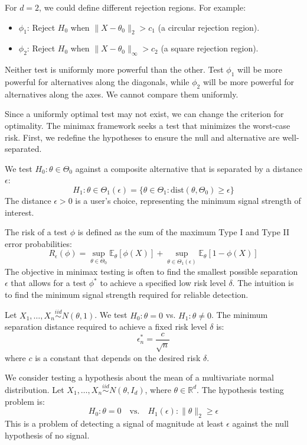 For $d=2$, we could define different rejection regions. For example:
\begin{itemize}
    \item $\phi_1$: Reject $H_0$ when $\|X - \theta_0\|_2 > c_1$ (a circular rejection region).
    \item $\phi_2$: Reject $H_0$ when $\|X - \theta_0\|_{\infty} > c_2$ (a square rejection region).
\end{itemize}
Neither test is uniformly more powerful than the other. Test $\phi_1$ will be more powerful for alternatives along the diagonals, while $\phi_2$ will be more powerful for alternatives along the axes. We cannot compare them uniformly.


Since a uniformly optimal test may not exist, we can change the criterion for optimality. The minimax framework seeks a test that minimizes the worst-case risk. First, we redefine the hypotheses to ensure the null and alternative are well-separated.

\begin{de}
We test $H_0: \theta \in \Theta_0$ against a composite alternative that is separated by a distance $\epsilon$:
$$
H_1: \theta \in \Theta_1(\epsilon) = \{ \theta \in \Theta_1 : \text{dist}(\theta, \Theta_0) \ge \epsilon \}
$$
The distance $\epsilon > 0$ is a user's choice, representing the minimum signal strength of interest.
\end{de}

The risk of a test $\phi$ is defined as the sum of the maximum Type I and Type II error probabilities:
$$
R_{\epsilon}(\phi) = \sup_{\theta \in \Theta_0} \mathbb{E}_{\theta}[\phi(X)] + \sup_{\theta \in \Theta_1(\epsilon)} \mathbb{E}_{\theta}[1-\phi(X)]
$$
The objective in minimax testing is often to find the smallest possible separation $\epsilon$ that allows for a test $\phi^*$ to achieve a specified low risk level $\delta$. The intuition is to find the minimum signal strength required for reliable detection.

\begin{eg} Let $X_1, \dots, X_n \stackrel{iid}{\sim} N(\theta, 1)$. We test $H_0: \theta=0$ vs. $H_1: \theta \neq 0$. The minimum separation distance required to achieve a fixed risk level $\delta$ is:
$$
\epsilon_n^* = \frac{c}{\sqrt{n}}
$$
where $c$ is a constant that depends on the desired risk $\delta$.
\end{eg} 


We consider testing a hypothesis about the mean of a multivariate normal distribution. Let $X_1, \dots, X_n \stackrel{iid}{\sim} N(\theta, I_d)$, where $\theta \in \mathbb{R}^d$. The hypothesis testing problem is:
$$
H_0: \theta = 0 \quad \text{vs.} \quad H_1(\epsilon): \|\theta\|_2 \ge \epsilon
$$
This is a problem of detecting a signal of magnitude at least $\epsilon$ against the null hypothesis of no signal.

